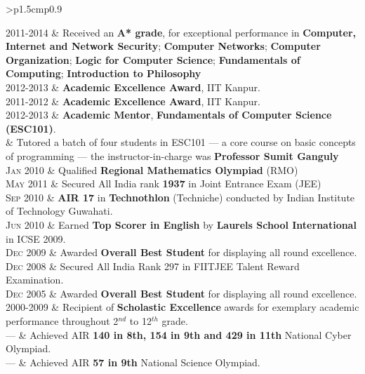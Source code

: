\documentclass[a4paper,10pt]{article} %
\newcommand{\itemlist}[1]{
    \begin{tabular}{>{\raggedleft}p{1.5cm}p{0.9\linewidth}}
        #1
    \end{tabular}
}
\begin{document}
\itemlist {
    \textsc{2011-2014}   & Received an \textbf{A* grade}, for exceptional performance in
                            \textbf{Computer, Internet and Network Security};
                            \textbf{Computer Networks};
                            \textbf{Computer Organization};
                            \textbf{Logic for Computer Science};
                            \textbf{Fundamentals of Computing};
                            \textbf{Introduction to Philosophy} \\
    \textsc{2012-2013}   & \textbf{Academic Excellence Award}, IIT Kanpur. \\
    \textsc{2011-2012}   & \textbf{Academic Excellence Award}, IIT Kanpur. \\
    \textsc{2012-2013}   & \textbf{Academic Mentor}, \textbf{Fundamentals of Computer Science (ESC101)}. \\
                         & \footnotesize{Tutored a batch of four students in ESC101 --- a core course on
                            basic concepts of programming --- the instructor-in-charge was \textbf{Professor Sumit Ganguly}}\\
    \textsc{Jan 2010}    & Qualified \textbf{Regional Mathematics Olympiad} (RMO) \\
    \textsc{May 2011}    & Secured All India rank \textbf{1937} in Joint Entrance Exam (JEE) \\
    \textsc{Sep 2010}    & \textbf{AIR 17} in \textbf{Technothlon} (Techniche) conducted by Indian Institute of Technology Guwahati. \\
    \textsc{Jun 2010}    & Earned \textbf{Top Scorer in English} by \textbf{Laurels School International} in ICSE 2009. \\
    \textsc{Dec 2009}    & Awarded \textbf{Overall Best Student} for displaying all round excellence. \\
    \textsc{Dec 2008}    & Secured All India Rank 297 in FIITJEE Talent Reward Examination. \\
    \textsc{Dec 2005}    & Awarded \textbf{Overall Best Student} for displaying all round excellence. \\
    \textsc{2000-2009}   & Recipient of \textbf{Scholastic Excellence} awards for exemplary academic performance throughout
                            2$^{nd}$ to 12$^{th}$ grade. \\
    \textsc{---}         & Achieved AIR \textbf{140 in 8th, 154 in 9th and 429 in 11th} National Cyber Olympiad.\\
    \textsc{---}         & Achieved AIR \textbf{57 in 9th} National Science Olympiad.\\
}
\end{document}
